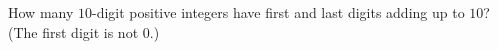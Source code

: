 How many $10$-digit positive integers have first and last digits adding up to $10$? (The first digit is not $0$.)
